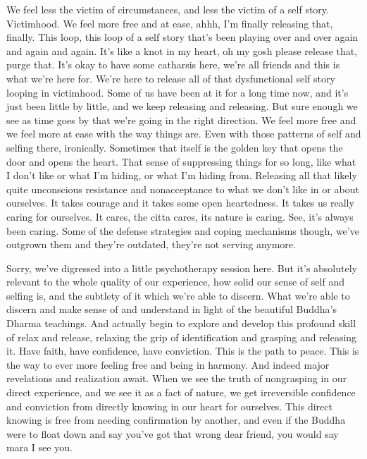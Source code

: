 \documentclass[12pt,openany]{book}
\begin{document}
We feel less the victim of circumstances, and less the victim of a self story. Victimhood. We feel more free and at ease, ahhh, I’m finally releasing that, finally. This loop, this loop of a self story that’s been playing over and over again and again and again. It's like a knot in my heart, oh my gosh please release that, purge that. It's okay to have some catharsis here, we're all friends and this is what we're here for. We're here to release all of that dysfunctional self story looping in victimhood. Some of us have been at it for a long time now, and it's just been little by little, and we keep releasing and releasing. But sure enough we see as time goes by that we're going in the right direction. We feel more free and we feel more at ease with the way things are. Even with those patterns of self and selfing there, ironically. Sometimes that itself is the golden key that opens the door and opens the heart. That sense of suppressing things for so long, like what I don't like or what I'm hiding, or what I'm hiding from. Releasing all that likely quite unconscious resistance and nonacceptance to what we don't like in or about ourselves. It takes courage and it takes some open heartedness. It takes us really caring for ourselves. It cares, the citta cares, its nature is caring. See, it's always been caring. Some of the defense strategies and coping mechanisms though, we've outgrown them and they're outdated, they're not serving anymore.

Sorry, we've digressed into a little psychotherapy session here. But it's absolutely relevant to the whole quality of our experience, how solid our sense of self and selfing is, and the subtlety of it which we're able to discern. What we're able to discern and make sense of and understand in light of the beautiful Buddha’s Dharma teachings. And actually begin to explore and develop this profound skill of relax and release, relaxing the grip of identification and grasping and releasing it. Have faith, have confidence, have conviction. This is the path to peace. This is the way to ever more feeling free and being in harmony. And indeed major revelations and realization await. When we see the truth of nongrasping in our direct experience, and we see it as a fact of nature, we get irreversible confidence and conviction from directly knowing in our heart for ourselves. This direct knowing is free from needing confirmation by another, and even if the Buddha were to float down and say you’ve got that wrong dear friend, you would say mara I see you.
\end{document}
